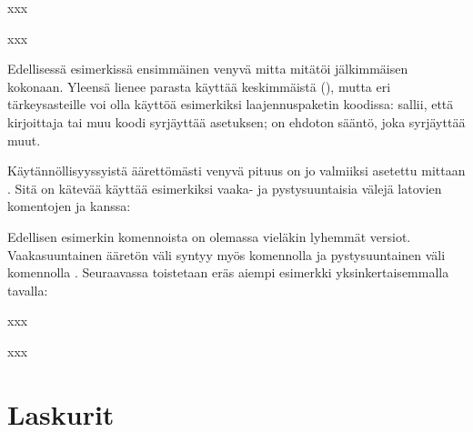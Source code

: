 \begin{koodilohkosis}
x\hspace{0mm plus 1filll}x\hspace{0mm plus 1fill}x
\end{koodilohkosis}

\begin{tulossis}
  x\hspace{0mm plus 1filll}x\hspace{0mm plus 1fill}x
\end{tulossis}

\noindent
Edellisessä esimerkissä ensimmäinen venyvä mitta  mitätöi
jälkimmäisen  kokonaan. Yleensä lienee parasta käyttää
keskimmäistä (), mutta eri tärkeysasteille voi olla käyttöä
esimerkiksi laajennuspaketin koodissa:  sallii, että
kirjoittaja tai muu koodi syrjäyttää asetuksen;  on ehdoton
sääntö, joka syrjäyttää muut.

Käytännöllisyyssyistä äärettömästi venyvä pituus 
on jo valmiiksi asetettu mittaan . Sitä on kätevää käyttää
esimerkiksi vaaka- ja pystysuuntaisia välejä latovien komentojen
 ja  kanssa:

\begin{koodilohkosis}
\hspace{\fill} %
\vspace{\fill} %
\end{koodilohkosis}

\noindent
Edellisen esimerkin komennoista on olemassa vieläkin lyhemmät versiot.
Vaakasuuntainen ääretön väli syntyy myös komennolla  ja
pystysuuntainen väli komennolla . Seuraavassa toistetaan
eräs aiempi esimerkki yksinkertaisemmalla tavalla:

\begin{koodilohkosis}
x\hfill x\hfill\hfill x
\end{koodilohkosis}

\begin{tulossis}
  x\hfill x\hfill\hfill x
\end{tulossis}

\section{Laskurit}
\label{luku/laskurit}

